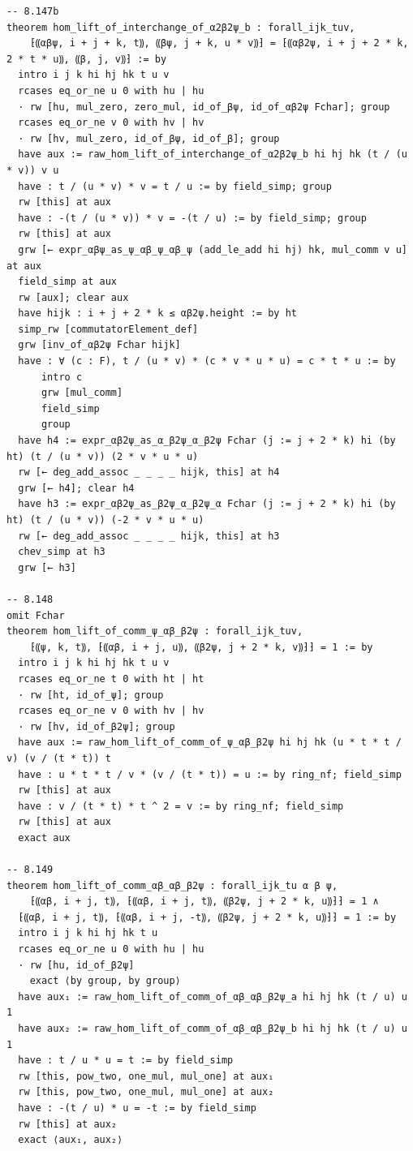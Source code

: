 \begin{Verbatim}
-- 8.147b
theorem hom_lift_of_interchange_of_α2β2ψ_b : forall_ijk_tuv,
    ⁅⸨αβψ, i + j + k, t⸩, ⸨βψ, j + k, u * v⸩⁆ = ⁅⸨αβ2ψ, i + j + 2 * k, 2 * t * u⸩, ⸨β, j, v⸩⁆ := by
  intro i j k hi hj hk t u v
  rcases eq_or_ne u 0 with hu | hu
  · rw [hu, mul_zero, zero_mul, id_of_βψ, id_of_αβ2ψ Fchar]; group
  rcases eq_or_ne v 0 with hv | hv
  · rw [hv, mul_zero, id_of_βψ, id_of_β]; group
  have aux := raw_hom_lift_of_interchange_of_α2β2ψ_b hi hj hk (t / (u * v)) v u
  have : t / (u * v) * v = t / u := by field_simp; group
  rw [this] at aux
  have : -(t / (u * v)) * v = -(t / u) := by field_simp; group
  rw [this] at aux
  grw [← expr_αβψ_as_ψ_αβ_ψ_αβ_ψ (add_le_add hi hj) hk, mul_comm v u] at aux
  field_simp at aux
  rw [aux]; clear aux
  have hijk : i + j + 2 * k ≤ αβ2ψ.height := by ht
  simp_rw [commutatorElement_def]
  grw [inv_of_αβ2ψ Fchar hijk]
  have : ∀ (c : F), t / (u * v) * (c * v * u * u) = c * t * u := by
      intro c
      grw [mul_comm]
      field_simp
      group
  have h4 := expr_αβ2ψ_as_α_β2ψ_α_β2ψ Fchar (j := j + 2 * k) hi (by ht) (t / (u * v)) (2 * v * u * u)
  rw [← deg_add_assoc _ _ _ _ hijk, this] at h4
  grw [← h4]; clear h4
  have h3 := expr_αβ2ψ_as_β2ψ_α_β2ψ_α Fchar (j := j + 2 * k) hi (by ht) (t / (u * v)) (-2 * v * u * u)
  rw [← deg_add_assoc _ _ _ _ hijk, this] at h3
  chev_simp at h3
  grw [← h3]

-- 8.148
omit Fchar
theorem hom_lift_of_comm_ψ_αβ_β2ψ : forall_ijk_tuv,
    ⁅⸨ψ, k, t⸩, ⁅⸨αβ, i + j, u⸩, ⸨β2ψ, j + 2 * k, v⸩⁆⁆ = 1 := by
  intro i j k hi hj hk t u v
  rcases eq_or_ne t 0 with ht | ht
  · rw [ht, id_of_ψ]; group
  rcases eq_or_ne v 0 with hv | hv
  · rw [hv, id_of_β2ψ]; group
  have aux := raw_hom_lift_of_comm_of_ψ_αβ_β2ψ hi hj hk (u * t * t / v) (v / (t * t)) t
  have : u * t * t / v * (v / (t * t)) = u := by ring_nf; field_simp
  rw [this] at aux
  have : v / (t * t) * t ^ 2 = v := by ring_nf; field_simp
  rw [this] at aux
  exact aux

-- 8.149
theorem hom_lift_of_comm_αβ_αβ_β2ψ : forall_ijk_tu α β ψ,
    ⁅⸨αβ, i + j, t⸩, ⁅⸨αβ, i + j, t⸩, ⸨β2ψ, j + 2 * k, u⸩⁆⁆ = 1 ∧
  ⁅⸨αβ, i + j, t⸩, ⁅⸨αβ, i + j, -t⸩, ⸨β2ψ, j + 2 * k, u⸩⁆⁆ = 1 := by
  intro i j k hi hj hk t u
  rcases eq_or_ne u 0 with hu | hu
  · rw [hu, id_of_β2ψ]
    exact ⟨by group, by group⟩
  have aux₁ := raw_hom_lift_of_comm_of_αβ_αβ_β2ψ_a hi hj hk (t / u) u 1
  have aux₂ := raw_hom_lift_of_comm_of_αβ_αβ_β2ψ_b hi hj hk (t / u) u 1
  have : t / u * u = t := by field_simp
  rw [this, pow_two, one_mul, mul_one] at aux₁
  rw [this, pow_two, one_mul, mul_one] at aux₂
  have : -(t / u) * u = -t := by field_simp
  rw [this] at aux₂
  exact ⟨aux₁, aux₂⟩


\end{Verbatim}

